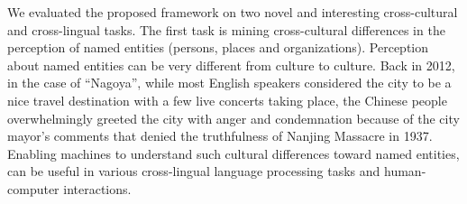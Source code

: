 %
%


We evaluated the proposed framework on two novel and interesting cross-cultural and cross-lingual tasks.
The first task is mining cross-cultural differences in
the perception of named entities (persons, places and organizations). 
Perception about named entities can be very different from culture to culture. 
Back in 2012, in the case of ``Nagoya'', while most English speakers considered 
the city to be a nice travel destination with a few live concerts taking place, 
the Chinese people overwhelmingly greeted the city with anger and 
condemnation because of the city mayor's comments that denied the
truthfulness of Nanjing Massacre in 1937. Enabling machines to understand
such cultural differences toward named entities, can be useful in various
cross-lingual language processing tasks and human-computer interactions.

